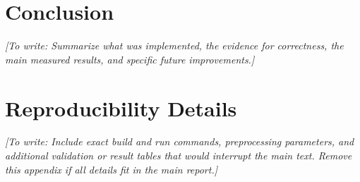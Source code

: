 \documentclass[12pt,letterpaper]{article}
\newcommand{\placeholder}[1]{\par\noindent\textit{[To write: #1]}\par}
\begin{document}
%

\section{Conclusion}
\label{sec:conclusion}
\placeholder{Summarize what was implemented, the evidence for correctness,
the main measured results, and specific future improvements.}

\clearpage
{}
{}
\nocite{han2000fpgrowth,vergara2012gas}



\appendix
\section{Reproducibility Details}
\label{app:reproduction}
\placeholder{Include exact build and run commands, preprocessing parameters,
and additional validation or result tables that would interrupt the main text.
Remove this appendix if all details fit in the main report.}
\end{document}
